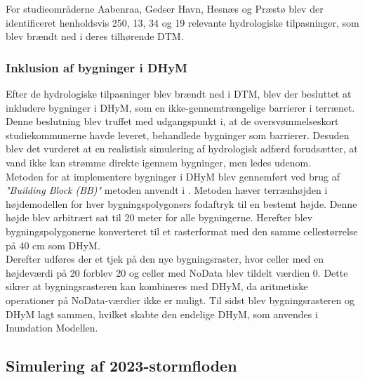 For studieområderne Aabenraa, Gedser Havn, Hesnæs og Præstø blev der identificeret henholdsvis 250, 13, 34 og 19 relevante hydrologiske tilpasninger, som blev brændt ned i deres tilhørende DTM.


\subsubsection{Inklusion af bygninger i DHyM} \label{Afsnit: Inklusion af bygninger i DHyM}

Efter de hydrologiske tilpasninger blev brændt ned i DTM, blev der besluttet at inkludere bygninger i DHyM, som en ikke-gennemtrængelige barrierer i terrænet. Denne beslutning blev truffet med udgangspunkt i, at de oversvømmelseskort studiekommunerne havde leveret, behandlede bygninger som barrierer. Desuden blev det vurderet at en realistisk simulering af hydrologisk adfærd forudsætter, at vand ikke kan strømme direkte igennem bygninger, men ledes udenom. \\

Metoden for at implementere bygninger i DHyM blev gennemført ved brug af \textit{"Building Block (BB)"} metoden anvendt i \cite{khosh_bin_ghomash_technical_2024}. Metoden hæver terrænhøjden i højdemodellen for hver bygningspolygoners fodaftryk til en bestemt højde. Denne højde blev arbitrært sat til 20 meter for alle bygningerne. Herefter blev bygningspolygonerne konverteret til et rasterformat med den samme cellestørrelse på 40 cm som DHyM. \\
Derefter udføres der et tjek på den nye bygningsraster, hvor celler med en højdeværdi på 20 forblev 20 og celler med NoData blev tildelt værdien 0. Dette sikrer at bygningsrasteren kan kombineres med DHyM, da aritmetiske operationer på NoData-værdier ikke er muligt. Til sidst blev bygningsrasteren og DHyM lagt sammen, hvilket skabte den endelige DHyM, som anvendes i Inundation Modellen.


\subsection{Simulering af 2023-stormfloden}\label{Afsnit: Simulering af stormflod 2023}

